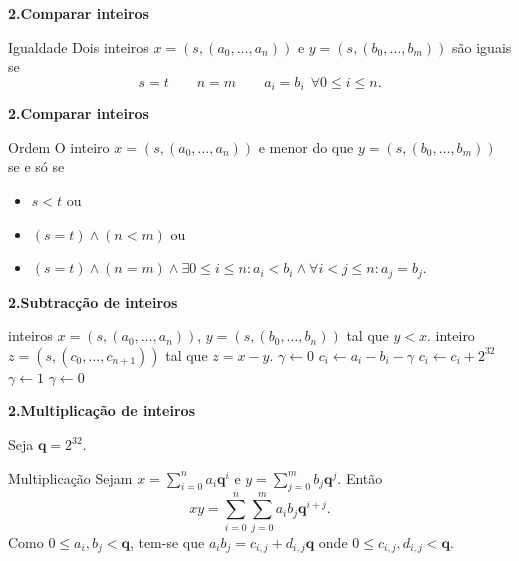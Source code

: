 \documentclass{beamer}
\newcommand{\q}{\mathbf{q}}
\begin{document}
\begin{frame}[fragile]{\bf 2.}{\bf Comparar inteiros}

\begin{block}{Igualdade}
 Dois inteiros $x=(s,(a_0,\ldots, a_n))$ e $y=(s,(b_0,\ldots, b_m))$ são iguais se
$$s=t \qquad n=m \qquad a_i=b_i \:\:\forall 0\leq i\leq n.$$
\end{block}
 
\end{frame}


\begin{frame}[fragile]{\bf 2.}{\bf Comparar inteiros}

\begin{block}{Ordem}
 O inteiro $x=(s,(a_0,\ldots, a_n))$ e menor do que $y=(s,(b_0,\ldots, b_m))$ se e só se
\begin{itemize}
 \item[] $s<t$ ou
 \item[] $(s=t) \wedge (n<m)$  ou 
 \item[] $(s=t) \wedge (n=m) \wedge \exists 0\leq i \leq n: a_i<b_i \wedge \forall i<j\leq n: a_j=b_j$.
\end{itemize}

\end{block}

\end{frame}


\begin{frame}[fragile]{\bf 2.}{\bf Subtracção de inteiros}
\begin{algorithmic}
\REQUIRE inteiros $x=(s,(a_0,\ldots, a_n))$, $y=(s,(b_0,\ldots, b_n))$ tal que $y<x$.
\ENSURE inteiro $z=(s, (c_0, \ldots, c_{n+1}))$ tal que $z=x-y$.
\STATE $\gamma \leftarrow 0$ 
  \STATE $c_i \leftarrow a_i-b_i-\gamma$
        \STATE $c_i \leftarrow c_i + 2^{32}$
        \STATE $\gamma \leftarrow 1$
  \ELSE
	\STATE $\gamma \leftarrow 0$
  \ENDIF
\ENDFOR
\end{algorithmic}

\end{frame}




\begin{frame}[fragile]{\bf 2.}{\bf Multiplicação de inteiros}

Seja $\q=2^{32}$.
\begin{block}{Multiplicação}
 Sejam $x=\sum_{i=0}^n a_i\q^i$ e $y=\sum_{j=0}^m b_j\q^j$. Então
$$ xy = \sum_{i=0}^n \sum_{j=0}^m a_ib_j \q^{i+j}.$$
Como $0\leq a_i, b_j < \q$, tem-se que $a_ib_j = c_{i,j} + d_{i,j}\q$ onde $0\leq c_{i,j}, d_{i,j} < \q$.
\end{block}


\end{frame}
\end{document}
